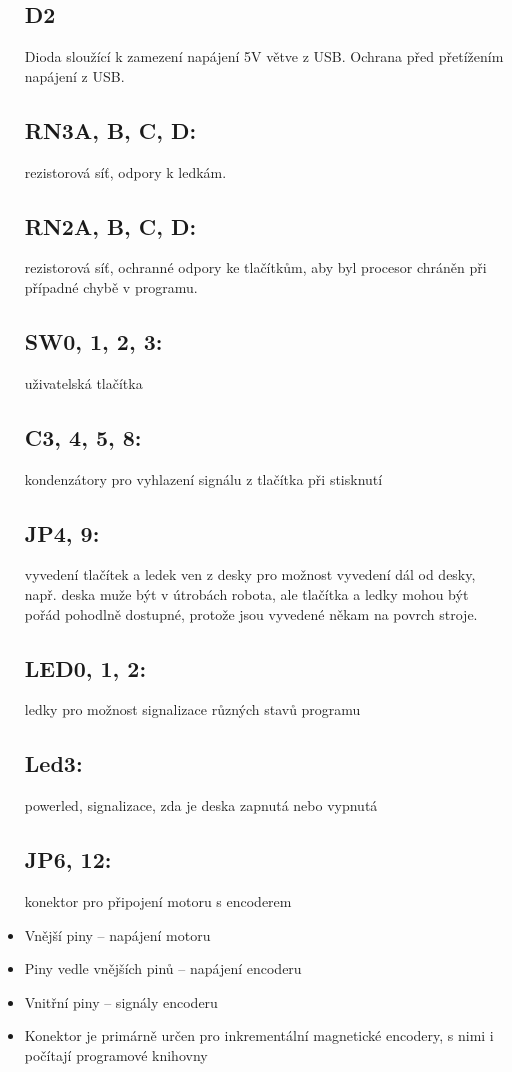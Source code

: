 \documentclass{template/socthesis}
\begin{document}
\begin{itemize}
	\subsection{D2}
	Dioda sloužící k zamezení napájení 5V větve z USB.
	Ochrana před přetížením napájení z USB.
	
	\subsection{RN3A, B, C, D:}
	rezistorová síť, odpory k ledkám.
	
	\subsection*{RN2A, B, C, D:}
	rezistorová síť, ochranné odpory ke tlačítkům, aby 
	byl procesor chráněn při případné chybě 
	v programu.
	
	\subsection*{SW0, 1, 2, 3:}
	uživatelská tlačítka
	
	\subsection*{C3, 4, 5, 8:}
	kondenzátory pro vyhlazení signálu z tlačítka při stisknutí
	
	\subsection*{JP4, 9:}
	vyvedení tlačítek a ledek ven z desky pro možnost	
	vyvedení dál od desky, např. deska muže být v útrobách robota, ale tlačítka a ledky mohou být 
	pořád pohodlně dostupné, protože jsou vyvedené	
	někam na povrch stroje.
	
	\subsection*{LED0, 1, 2:}
	ledky pro možnost signalizace různých stavů programu
	
	\subsection*{Led3:}
	powerled, signalizace, zda je deska zapnutá nebo vypnutá
	
	\subsection*{JP6, 12:}
	konektor pro připojení motoru s encoderem
	\item Vnější piny – napájení motoru
	\item Piny vedle vnějších pinů – napájení encoderu
	\item Vnitřní piny – signály encoderu
	\item Konektor je primárně určen pro inkrementální magnetické encodery, s nimi i počítají programové knihovny
	

\end{itemize}
\end{document}
